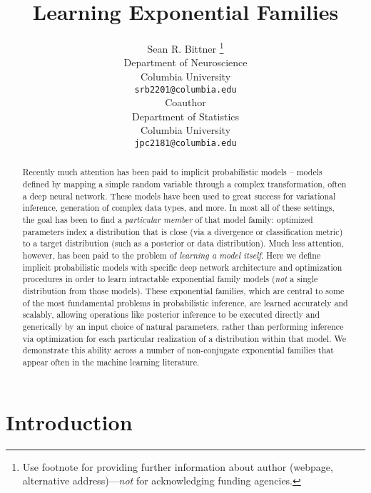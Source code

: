 \documentclass{article}
\title{Learning Exponential Families}
\author{
  Sean R. Bittner \thanks{Use footnote for providing further
    information about author (webpage, alternative
    address)---\emph{not} for acknowledging funding agencies.} \\
  Department of Neuroscience\\
  Columbia University\\
  \texttt{srb2201@columbia.edu} \\
 \And
Coauthor \\
Department of Statistics\\
  Columbia University\\
 \texttt{jpc2181@columbia.edu} \\
}
\begin{document}

\maketitle

\begin{abstract}
  
Recently much attention has been paid to implicit probabilistic models -- models defined by mapping a simple random variable through a complex transformation, often a deep neural network.  These models have been used to great success for variational inference, generation of complex data types, and more.  In most all of these settings, the goal has been to find a \emph{particular member} of that model family: optimized parameters index a distribution that is close (via a divergence or classification metric) to a target distribution (such as a posterior or data distribution).  Much less attention, however, has been paid to the problem of \emph{learning a model itself}.   Here we define implicit probabilistic models with specific deep network architecture and optimization procedures in order to learn intractable exponential family models (\emph{not} a single distribution from those models).  These exponential families, which are central to some of the most fundamental problems in probabilistic inference, are learned accurately and scalably, allowing operations like posterior inference to be executed directly and generically by an input choice of natural parameters, rather than performing inference via optimization for each particular realization of a distribution within that model.  We demonstrate this ability across a number of non-conjugate exponential families that appear often in the machine learning literature.
  
\end{abstract}

\section{Introduction}
\end{document}
